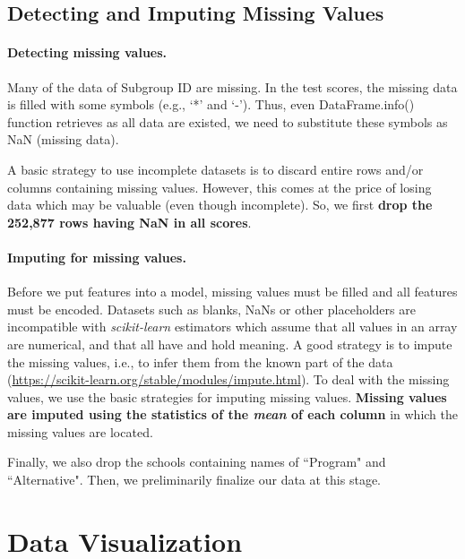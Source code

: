 \documentclass[11pt]{article}
\begin{document}
\subsection{Detecting and Imputing Missing Values}

\paragraph*{Detecting missing values.} 

Many of the data of Subgroup ID are missing. In the test scores, the missing data is filled with some symbols (e.g., ‘*’ and ‘-’). Thus, even DataFrame.info() function retrieves as all data are existed, we need to substitute these symbols as NaN (missing data).

A basic strategy to use incomplete datasets is to discard entire rows and/or columns containing missing values. However, this comes at the price of losing data which may be valuable (even though incomplete).  
So, we first \textbf{drop the 252,877 rows having NaN in all scores}.

\paragraph*{Imputing for missing values.}

Before we put features into a model, missing values must be filled and all features must be encoded.
Datasets such as blanks, NaNs or other placeholders are incompatible with \textit{scikit-learn} estimators which assume that all values in an array are numerical, and that all have and hold meaning. 
A good strategy is to impute the missing values, i.e., to infer them from the known part of the data (\url{https://scikit-learn.org/stable/modules/impute.html}).
%
To deal with the missing values, we use the basic strategies for imputing missing values. \textbf{Missing values are imputed using the statistics of the \textit{mean} of each column} in which the missing values are located.

Finally, we also drop the schools containing names of ``Program" and ``Alternative".
Then, we preliminarily finalize our data at this stage.

\section{Data Visualization}
\label{Data Visualization}
\end{document}
